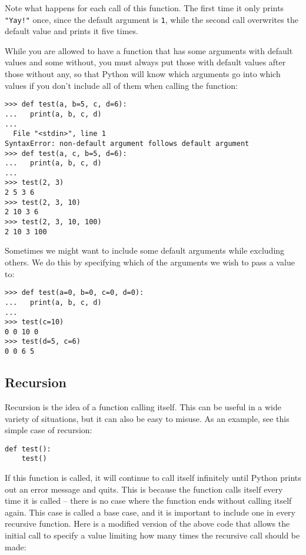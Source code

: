 \documentclass[11pt]{cselabheader}
\begin{document}
Note what happens for each call of this function. The first time it only prints \lstinline{"Yay!"} once, since the default argument is \lstinline{1}, while the second call overwrites the default value and prints it five times.

While you are allowed to have a function that has some arguments with default values and some without, you must always put those with default values after those without any, so that Python will know which arguments go into which values if you don't include all of them when calling the function:

\begin{lstlisting}[style=ipython]
>>> def test(a, b=5, c, d=6):
...   print(a, b, c, d)
... 
  File "<stdin>", line 1
SyntaxError: non-default argument follows default argument
>>> def test(a, c, b=5, d=6):
...   print(a, b, c, d)
... 
>>> test(2, 3)
2 5 3 6
>>> test(2, 3, 10)
2 10 3 6
>>> test(2, 3, 10, 100)
2 10 3 100
\end{lstlisting}

Sometimes we might want to include some default arguments while excluding others. We do this by specifying which of the arguments we wish to pass a value to:

\begin{lstlisting}[style=ipython]
>>> def test(a=0, b=0, c=0, d=0):
...   print(a, b, c, d)
... 
>>> test(c=10)
0 0 10 0
>>> test(d=5, c=6)
0 0 6 5
\end{lstlisting}

\subsection{Recursion}
\label{subsec:recur}
Recursion is the idea of a function calling itself. This can be useful in a wide variety of situations, but it can also be easy to misuse. As an example, see this simple case of recursion:

\begin{lstlisting}[style=python]
def test():
    test()
\end{lstlisting}

If this function is called, it will continue to call itself infinitely until Python prints out an error message and quits. This is because the function calls itself every time it is called -- there is no case where the function ends without calling itself again. This case is called a base case, and it is important to include one in every recursive function. Here is a modified version of the above code that allows the initial call to specify a value limiting how many times the recursive call should be made:
\end{document}

